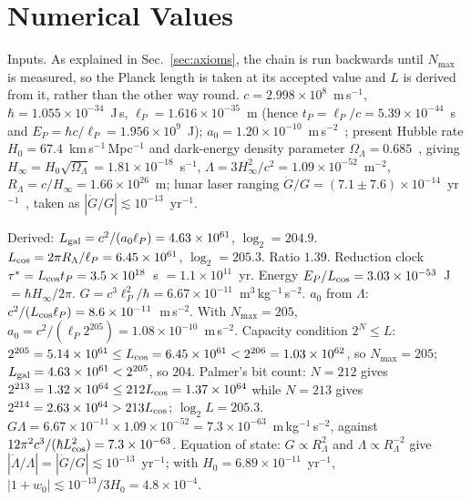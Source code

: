\documentclass[aps,prd,twocolumn,superscriptaddress,nofootinbib,showkeys]{revtex4-2}
\begin{document}
\appendix

\section{Numerical Values}
\label{app:numbers}

Inputs. As explained in Sec.~\ref{sec:axioms}, the chain is run backwards until $N_{\max}$ is measured, so the Planck length is taken at its accepted value and $L$ is derived from it, rather than the other way round. $c = 2.998\times10^8$~m\,s$^{-1}$, $\hbar = 1.055\times10^{-34}$~J\,s, $\ell_P = 1.616\times10^{-35}$~m (hence $t_P = \ell_P/c = 5.39\times10^{-44}$~s and $E_P = \hbar c/\ell_P = 1.956\times10^9$~J); $a_0 = 1.20\times10^{-10}$~m\,s$^{-2}$~\cite{mcgaugh2016}; present Hubble rate $H_0 = 67.4$~km\,s$^{-1}$\,Mpc$^{-1}$ and dark-energy density parameter $\Omega_\Lambda = 0.685$~\cite{planck2018}, giving $H_\infty = H_0\sqrt{\Omega_\Lambda} = 1.81\times10^{-18}$~s$^{-1}$, $\Lambda = 3H_\infty^2/c^2 = 1.09\times10^{-52}$~m$^{-2}$, $R_\Lambda = c/H_\infty = 1.66\times10^{26}$~m; lunar laser ranging $\dot G/G = (7.1\pm7.6)\times10^{-14}$~yr$^{-1}$~\cite{hofmann2018}, taken as $|\dot G/G|\lesssim10^{-13}$~yr$^{-1}$.

Derived: $L_{\rm gal} = c^2/(a_0\ell_P) = 4.63\times10^{61}$, $\log_2 = 204.9$. $L_{\rm cos} = 2\pi R_\Lambda/\ell_P = 6.45\times10^{61}$, $\log_2 = 205.3$. Ratio $1.39$. Reduction clock $\tau^* = L_{\rm cos}t_P = 3.5\times10^{18}$~s $= 1.1\times10^{11}$~yr. Energy $E_P/L_{\rm cos} = 3.03\times10^{-53}$~J $= \hbar H_\infty/2\pi$. $G = c^3\ell_P^2/\hbar = 6.67\times10^{-11}$~m$^3$\,kg$^{-1}$\,s$^{-2}$. $a_0$ from $\Lambda$: $c^2/(L_{\rm cos}\ell_P) = 8.6\times10^{-11}$~m\,s$^{-2}$. With $N_{\max} = 205$, $a_0 = c^2/(\ell_P 2^{205}) = 1.08\times10^{-10}$~m\,s$^{-2}$. Capacity condition $2^N\le L$: $2^{205} = 5.14\times10^{61}\le L_{\rm cos} = 6.45\times10^{61} < 2^{206} = 1.03\times10^{62}$, so $N_{\max}=205$; $L_{\rm gal} = 4.63\times10^{61} < 2^{205}$, so $204$. Palmer's bit count: $N=212$ gives $2^{213} = 1.32\times10^{64}\le 212L_{\rm cos} = 1.37\times10^{64}$ while $N=213$ gives $2^{214} = 2.63\times10^{64} > 213L_{\rm cos}$; $\log_2 L = 205.3$. $G\Lambda = 6.67\times10^{-11}\times1.09\times10^{-52} = 7.3\times10^{-63}$~m\,kg$^{-1}$\,s$^{-2}$, against $12\pi^2c^3/(\hbar L_{\rm cos}^2) = 7.3\times10^{-63}$. Equation of state: $G\propto R_\Lambda^2$ and $\Lambda\propto R_\Lambda^{-2}$ give $|\dot\Lambda/\Lambda| = |\dot G/G|\lesssim10^{-13}$~yr$^{-1}$; with $H_0 = 6.89\times10^{-11}$~yr$^{-1}$, $|1+w_0| \lesssim 10^{-13}/3H_0 = 4.8\times10^{-4}$.
\end{document}
